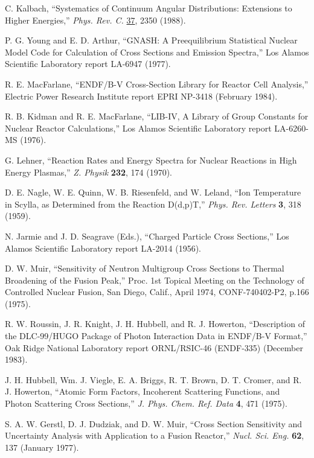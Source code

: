 \documentclass[11pt,twoside]{NJOYMan}
\begin{document}
\begin{thebibliography}{99}
\begin{singlespace}
 C. Kalbach, ``Systematics of Continuum Angular Distributions:
  Extensions to Higher Energies,''  {\it Phys. Rev. C.}
  \underline{37}, 2350 (1988).

 P. G. Young and E. D. Arthur, ``GNASH: A Preequilibrium
  Statistical Nuclear Model Code for Calculation of Cross Sections and
  Emission Spectra,''  Los Alamos Scientific Laboratory report LA-6947 (1977).

 R. E. MacFarlane, ``ENDF/B-V Cross-Section
  Library for Reactor Cell Analysis,'' Electric Power Research
  Institute report EPRI NP-3418 (February 1984).

 R. B. Kidman and R. E. MacFarlane, ``LIB-IV, A Library
  of Group Constants for Nuclear Reactor Calculations,'' Los Alamos
  Scientific Laboratory report LA-6260-MS (1976).

 G. Lehner, ``Reaction Rates and Energy Spectra
  for Nuclear Reactions in High Energy Plasmas,'' {\it Z. Physik}
  {\bf 232}, 174 (1970).

 D. E. Nagle, W. E. Quinn, W. B. Riesenfeld,
  and W. Leland, ``Ion Temperature in Scylla, as Determined from the
  Reaction D(d,p)T,'' {\it Phys. Rev. Letters} {\bf 3}, 318 (1959).

 N. Jarmie and J. D. Seagrave (Eds.),
  ``Charged Particle Cross Sections,'' Los Alamos Scientific
  Laboratory report LA-2014 (1956).

 D. W. Muir, ``Sensitivity of Neutron Multigroup
  Cross Sections to Thermal Broadening of the Fusion Peak,''
  Proc. 1st Topical Meeting on the Technology of Controlled
  Nuclear Fusion, San Diego, Calif., April 1974,
  CONF-740402-P2, p.166 (1975).

  R. W. Roussin, J. R. Knight, J. H. Hubbell, and R. J. Howerton,
  ``Description of the DLC-99/HUGO Package of Photon Interaction Data in
  ENDF/B-V Format,'' Oak Ridge National Laboratory report ORNL/RSIC-46
  (ENDF-335) (December 1983).

 J. H. Hubbell, Wm. J. Viegle, E. A. Briggs,
  R. T. Brown, D. T. Cromer, and R. J. Howerton, ``Atomic Form Factors,
  Incoherent Scattering Functions, and Photon Scattering Cross Sections,''
  {\it J. Phys. Chem. Ref. Data} {\bf 4}, 471 (1975).

 S. A. W. Gerstl, D. J. Dudziak, and D. W. Muir,
  ``Cross Section Sensitivity and Uncertainty Analysis with Application
  to a Fusion Reactor,'' {\it Nucl. Sci. Eng.} {\bf 62}, 137 (January 1977).


\end{singlespace}
\end{thebibliography}
\end{document}
